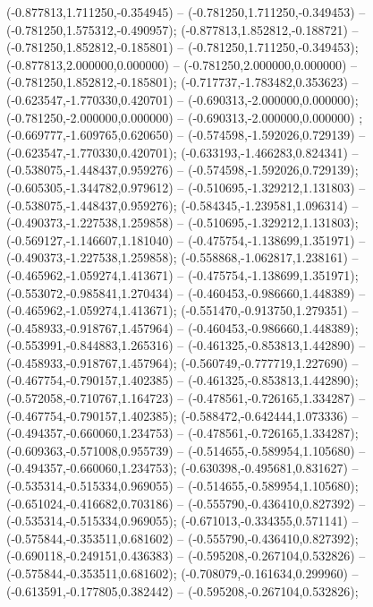  (-0.877813,1.711250,-0.354945) -- (-0.781250,1.711250,-0.349453) -- (-0.781250,1.575312,-0.490957);
 (-0.877813,1.852812,-0.188721) -- (-0.781250,1.852812,-0.185801) -- (-0.781250,1.711250,-0.349453);
 (-0.877813,2.000000,0.000000) -- (-0.781250,2.000000,0.000000) -- (-0.781250,1.852812,-0.185801);
 (-0.717737,-1.783482,0.353623) -- (-0.623547,-1.770330,0.420701) -- (-0.690313,-2.000000,0.000000);
 (-0.781250,-2.000000,0.000000) -- (-0.690313,-2.000000,0.000000) ;
 (-0.669777,-1.609765,0.620650) -- (-0.574598,-1.592026,0.729139) -- (-0.623547,-1.770330,0.420701);
 (-0.633193,-1.466283,0.824341) -- (-0.538075,-1.448437,0.959276) -- (-0.574598,-1.592026,0.729139);
 (-0.605305,-1.344782,0.979612) -- (-0.510695,-1.329212,1.131803) -- (-0.538075,-1.448437,0.959276);
 (-0.584345,-1.239581,1.096314) -- (-0.490373,-1.227538,1.259858) -- (-0.510695,-1.329212,1.131803);
 (-0.569127,-1.146607,1.181040) -- (-0.475754,-1.138699,1.351971) -- (-0.490373,-1.227538,1.259858);
 (-0.558868,-1.062817,1.238161) -- (-0.465962,-1.059274,1.413671) -- (-0.475754,-1.138699,1.351971);
 (-0.553072,-0.985841,1.270434) -- (-0.460453,-0.986660,1.448389) -- (-0.465962,-1.059274,1.413671);
 (-0.551470,-0.913750,1.279351) -- (-0.458933,-0.918767,1.457964) -- (-0.460453,-0.986660,1.448389);
 (-0.553991,-0.844883,1.265316) -- (-0.461325,-0.853813,1.442890) -- (-0.458933,-0.918767,1.457964);
 (-0.560749,-0.777719,1.227690) -- (-0.467754,-0.790157,1.402385) -- (-0.461325,-0.853813,1.442890);
 (-0.572058,-0.710767,1.164723) -- (-0.478561,-0.726165,1.334287) -- (-0.467754,-0.790157,1.402385);
 (-0.588472,-0.642444,1.073336) -- (-0.494357,-0.660060,1.234753) -- (-0.478561,-0.726165,1.334287);
 (-0.609363,-0.571008,0.955739) -- (-0.514655,-0.589954,1.105680) -- (-0.494357,-0.660060,1.234753);
 (-0.630398,-0.495681,0.831627) -- (-0.535314,-0.515334,0.969055) -- (-0.514655,-0.589954,1.105680);
 (-0.651024,-0.416682,0.703186) -- (-0.555790,-0.436410,0.827392) -- (-0.535314,-0.515334,0.969055);
 (-0.671013,-0.334355,0.571141) -- (-0.575844,-0.353511,0.681602) -- (-0.555790,-0.436410,0.827392);
 (-0.690118,-0.249151,0.436383) -- (-0.595208,-0.267104,0.532826) -- (-0.575844,-0.353511,0.681602);
 (-0.708079,-0.161634,0.299960) -- (-0.613591,-0.177805,0.382442) -- (-0.595208,-0.267104,0.532826);
